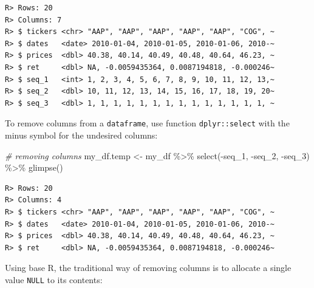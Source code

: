 \documentclass[
  12pt,
]{book}
\newenvironment{Shaded}{\begin{snugshade}}{\end{snugshade}}
\newcommand{\CommentTok}[1]{\textcolor[rgb]{0.37,0.37,0.37}{\textit{#1}}}
\newcommand{\ConstantTok}[1]{\textcolor[rgb]{0,0,0}{#1}}
\newcommand{\FunctionTok}[1]{\textcolor[rgb]{0,0,0}{#1}}
\newcommand{\NormalTok}[1]{#1}
\newcommand{\OtherTok}[1]{\textcolor[rgb]{0.37,0.37,0.37}{#1}}
\newcommand{\SpecialCharTok}[1]{\textcolor[rgb]{0,0,0}{#1}}
\begin{document}
\begin{verbatim}
R> Rows: 20
R> Columns: 7
R> $ tickers <chr> "AAP", "AAP", "AAP", "AAP", "AAP", "COG", ~
R> $ dates   <date> 2010-01-04, 2010-01-05, 2010-01-06, 2010-~
R> $ prices  <dbl> 40.38, 40.14, 40.49, 40.48, 40.64, 46.23, ~
R> $ ret     <dbl> NA, -0.0059435364, 0.0087194818, -0.000246~
R> $ seq_1   <int> 1, 2, 3, 4, 5, 6, 7, 8, 9, 10, 11, 12, 13,~
R> $ seq_2   <dbl> 10, 11, 12, 13, 14, 15, 16, 17, 18, 19, 20~
R> $ seq_3   <dbl> 1, 1, 1, 1, 1, 1, 1, 1, 1, 1, 1, 1, 1, 1, ~
\end{verbatim}

To remove columns from a \texttt{dataframe}, use function \texttt{dplyr::select} with the minus symbol for the undesired columns:

\begin{Shaded}
\begin{Highlighting}[]
\CommentTok{\# removing columns}
\NormalTok{my\_df.temp }\OtherTok{\textless{}{-}}\NormalTok{ my\_df }\SpecialCharTok{\%\textgreater{}\%}
  \FunctionTok{select}\NormalTok{(}\SpecialCharTok{{-}}\NormalTok{seq\_1, }\SpecialCharTok{{-}}\NormalTok{seq\_2, }\SpecialCharTok{{-}}\NormalTok{seq\_3) }\SpecialCharTok{\%\textgreater{}\%}
  \FunctionTok{glimpse}\NormalTok{()}
\end{Highlighting}
\end{Shaded}

\begin{verbatim}
R> Rows: 20
R> Columns: 4
R> $ tickers <chr> "AAP", "AAP", "AAP", "AAP", "AAP", "COG", ~
R> $ dates   <date> 2010-01-04, 2010-01-05, 2010-01-06, 2010-~
R> $ prices  <dbl> 40.38, 40.14, 40.49, 40.48, 40.64, 46.23, ~
R> $ ret     <dbl> NA, -0.0059435364, 0.0087194818, -0.000246~
\end{verbatim}

Using base R, the traditional way of removing columns is to allocate a single value \texttt{NULL} to its contents:

\begin{Shaded}
\end{Shaded}
\end{document}
